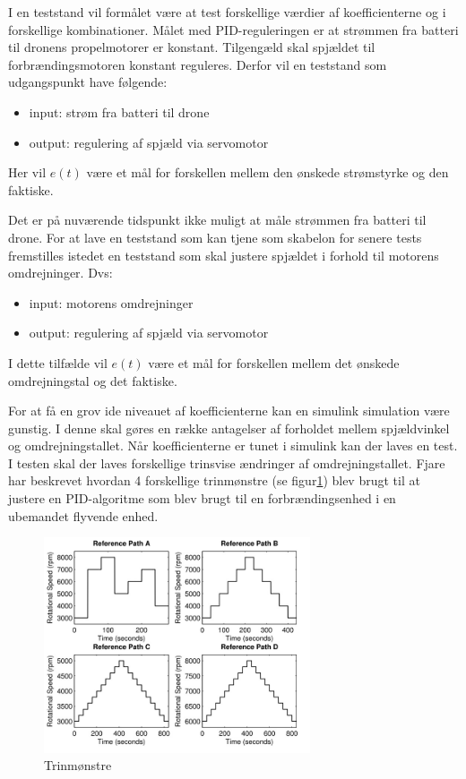 I en teststand vil formålet være at test forskellige værdier af koefficienterne og i forskellige kombinationer. Målet med PID-reguleringen er at strømmen fra batteri til dronens propelmotorer er konstant. Tilgengæld skal spjældet til forbrændingsmotoren konstant reguleres. Derfor vil en teststand som udgangspunkt have følgende:
\begin{itemize}
\item input: strøm fra batteri til drone
\item output: regulering af spjæld via servomotor
\end{itemize}

Her vil $e(t)$ være et mål for forskellen mellem den ønskede strømstyrke og den faktiske.

Det er på nuværende tidspunkt ikke muligt at måle strømmen fra batteri til drone. For at lave en teststand som kan tjene som skabelon for senere tests fremstilles istedet en teststand som skal justere spjældet i forhold til motorens omdrejninger. Dvs:

\begin{itemize}
\item input: motorens omdrejninger
\item output: regulering af spjæld via servomotor
\end{itemize}

I dette tilfælde vil $e(t)$ være et mål for forskellen mellem det ønskede omdrejningstal og det faktiske.

For at få en grov ide niveauet af koefficienterne kan en simulink simulation være gunstig. I denne skal gøres en række antagelser af forholdet mellem spjældvinkel og omdrejningstallet. Når koefficienterne er tunet i simulink kan der laves en test.
\clearpage
I testen skal der laves forskellige trinsvise ændringer af omdrejningstallet. Fjare\autocite{pid1} har beskrevet hvordan 4 forskellige trinmønstre (se figur\ref{fig:paths}) blev brugt til at justere en PID-algoritme som blev brugt til en forbrændingsenhed i en ubemandet flyvende enhed.

\begin{figure}[h]
  \centering
  \includegraphics[width=0.7\textwidth]{refpaths.JPG}
  \caption{Trinmønstre}
  \label{fig:paths}
\end{figure}

